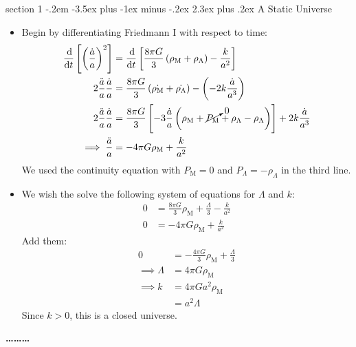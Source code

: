 \documentclass[12pt]{article}
\makeatletter
\newenvironment{problem}{\@startsection
	{section}
	{1}
	{-.2em}
	{-3.5ex plus -1ex minus -.2ex}
	{2.3ex plus .2ex}
	{\pagebreak[3]%
		\large\bf\noindent{Problem }
	}
}
{%
	\begin{center}\large\bf \ldots\ldots\ldots\end{center}}
\makeatother
\begin{document}
	\begin{problem}{A Static Universe}
		\begin{itemize}
			\item Begin by differentiating Friedmann I with respect to time: \begin{align*}
				\frac{\dif}{\dif t} \left[\left(\frac{\dot{a}}{a}\right)^2\right] &= \frac{\dif}{\dif t}  \left[\frac{8\pi G}{3}\left(\rho_\mathrm{M} + \rho_\Lambda\right) - \frac{k}{a^2}\right]
				\\
				2 \frac{\ddot{a}}{a} \frac{\dot{a}}{a} &= \frac{8\pi G}{3}\left(\dot{\rho_\mathrm{M}} + \dot{\rho_\Lambda}\right) - \left(-2k\frac{\dot{a}}{a^3}\right)
				\\
				2 \frac{\ddot{a}}{a} \frac{\dot{a}}{a} &= \frac{8\pi G}{3} \left[-3\frac{\dot{a}}{a}\left(\rho_\mathrm{M} + \cancelto{0}{P_\mathrm{M}} + \rho_\Lambda - \rho_\Lambda \right) \right]+ 2k\frac{\dot{a}}{a^3}
				\\
				\implies \frac{\ddot{a}}{a}&= -4\pi G\rho_\mathrm{M} + \frac{k}{a^2}
			\end{align*} We used the continuity equation with $P_\mathrm{M}=0$ and $P_\Lambda = -\rho_\Lambda$ in the third line.
			
			\item We wish the solve the following system of equations for $\Lambda$ and $k$: \begin{align*}
				0 &= \frac{8\pi G}{3}\rho_\mathrm{M} + \frac{\Lambda}{3} - \frac{k}{a^2}
				\\
				0 &= -4\pi G\rho_\mathrm{M} + \frac{k}{a^2}
			\end{align*} Add them: \begin{align*}
				0 &= -\frac{4\pi G}{3}\rho_\mathrm{M} + \frac{\Lambda}{3}
				\\
				\implies \Lambda &= 4\pi G \rho_\mathrm{M}
				\\
				\implies k &= 4\pi Ga^2\rho_\mathrm{M}
				\\
				&= a^2\Lambda
			\end{align*} Since $k>0$, this is a closed universe.
			

\end{itemize}
\end{problem}
\end{document}

